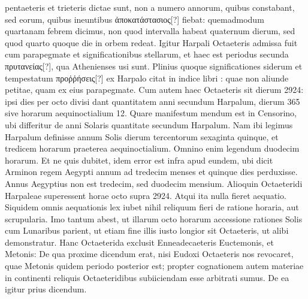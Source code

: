 pentaeteris et trieteris dictae sunt, non a numero annorum, quibus
constabant, sed eorum, quibus ineuntibus \textgreek{ἀποκατάστασιος[?]} fiebat:
quemadmodum quartanam febrem dicimus, non quod intervalla habeat
quaternum dierum, sed quod quarto quoque die in orbem redeat.
Igitur Harpali Octaeteris admissa fuit cum parapegmate
 et significationibus
stellarum, et haec est periodus secunda \textgreek{πρυτανείας[?]},
 qua Athenienses
usi sunt.
Plinius quoque significationes siderum et tempestatum
\textgreek{προῤῥήσεις[?]} ex Harpalo citat in indice libri :
 quae non aliunde
petitae, quam ex eius parapegmate.
Cum autem haec Octaeteris sit
dierum 2924: ipsi dies per octo divisi dant quantitatem anni secundum
Harpalum, dierum 365~ sive horarum aequinoctialium 12.
Quare manifestum mendum est in Censorino, ubi differitur de anni
Solaris quantitate secundum Harpalum.
Nam ibi legimus Harpalum
definisse annum Solis dierum tercentorum sexaginta quinque,
et tredicem horarum praeterea aequinoctialium.
Omnino enim legendum duodecim horarum.
Et ne quis dubitet, idem error est infra
apud eundem, ubi dicit Arminon regem Aegypti annum ad tredecim
menses et quinque dies perduxisse.
Annus Aegyptius non est tredecim,
sed duodecim mensium.
Alioquin Octaeteridi Harpaleae superessent
horae octo supra 2924.
Atqui ita nulla fieret aequatio.
Siquidem
omnis aequationis lex iubet nihil reliquum fieri de ratione horaria,
aut scrupularia.
Imo tantum abest, ut illarum octo horarum accessione
rationes Solis cum Lunaribus parient, ut etiam fine illis iusto
longior sit Octaeteris, ut alibi demonstratur.
Hanc Octaeterida exclusit
Enneadecaeteris Euctemonis, et Metonis: De qua proxime dicendum
erat, nisi Eudoxi Octaeteris nos revocaret, quae Metonis quidem
periodo posterior est; propter cognationem autem materiae in
continenti reliquis Octaeteridibus subiiciendam esse arbitrati sumus.
% 
De ea igitur prius dicendum.
%
